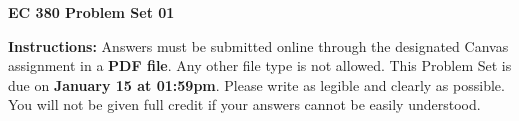 \documentclass[12pt]{exam}
\newcommand{\examdate}{\fontfamily{lmss} \textbf{January 15 at 01:59pm}} %
\begin{document}
\selectfont

\begin{center}
    \textbf{{\LARGE EC 380 Problem Set 01}} \\
    \bigskip 
\end{center}

\noindent \textbf{Instructions:} 
Answers must be submitted online through the designated Canvas assignment in a \textbf{PDF file}.
Any other file type is not allowed. 
This Problem Set is due on \examdate.
Please write as legible and clearly as possible. 
You will not be given full credit if your answers cannot be easily understood. 



\end{document}

